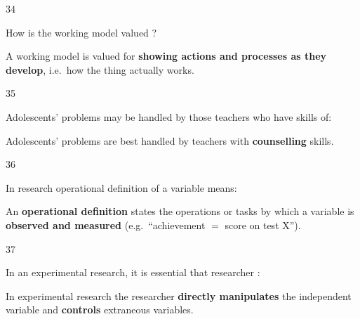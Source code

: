 \begin{question}{34}
{How is the working model valued ?\par}
\begin{explain}
A working model is valued for \textbf{showing actions and processes as they develop}, i.e.\ how the thing actually works.
\end{explain}
\end{question}

\begin{question}{35}
{Adolescents' problems may be handled by those teachers who have skills of:\par}
\begin{explain}
Adolescents' problems are best handled by teachers with \textbf{counselling} skills.
\end{explain}
\end{question}

\begin{question}{36}
{In research operational definition of a variable means:\par}
\begin{explain}
An \textbf{operational definition} states the operations or tasks by which a variable is \textbf{observed and measured} (e.g.\ ``achievement $=$ score on test X'').
\end{explain}
\end{question}

\begin{question}{37}
{In an experimental research, it is essential that researcher :\par}
\begin{explain}
In experimental research the researcher \textbf{directly manipulates} the independent variable and \textbf{controls} extraneous variables.
\end{explain}
\end{question}

